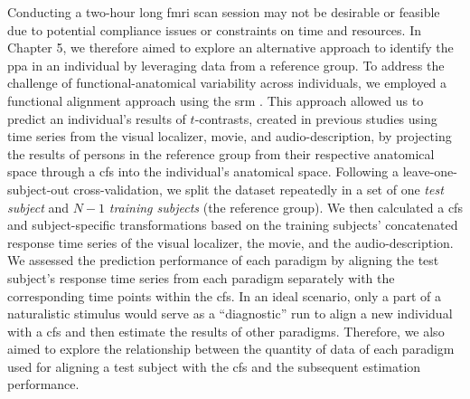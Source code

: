 %
Conducting a two-hour long \ac{fmri} scan session may not be desirable or
feasible due to potential compliance issues or constraints on time and
resources.
%
In Chapter 5, we therefore aimed to explore an alternative approach to identify
the \ac{ppa} in an individual by leveraging data from a reference group.
%
To address the challenge of functional-anatomical variability across
individuals, we employed a functional alignment approach using the \acf{srm}
\citep{chen2015reduced}.
%
This approach allowed us to predict an individual's results of $t$-contrasts,
created in previous studies using time series from the visual localizer, movie,
and audio-description, by projecting the results of persons in the reference
group from their respective anatomical space through a \ac{cfs} into the
individual's anatomical space.
%
Following a leave-one-subject-out cross-validation, we split the dataset
repeatedly in a set of one \textit{test subject} and $N-1$ \textit{training
subjects} (the reference group).
%
We then calculated a \ac{cfs} and subject-specific transformations based on the
training subjects' concatenated response time series of the visual localizer,
the movie, and the audio-description.
%
We assessed the prediction performance of each paradigm by aligning the test
subject's response time series from each paradigm separately with the
corresponding time points within the \ac{cfs}.
%
In an ideal scenario, only a part of a naturalistic stimulus would serve as a
``diagnostic'' run to align a new individual with a \ac{cfs} and then estimate
the results of other paradigms.
%
Therefore, we also aimed to explore the relationship between the quantity of
data of each paradigm used for aligning a test subject with the \ac{cfs} and the
subsequent estimation performance.

